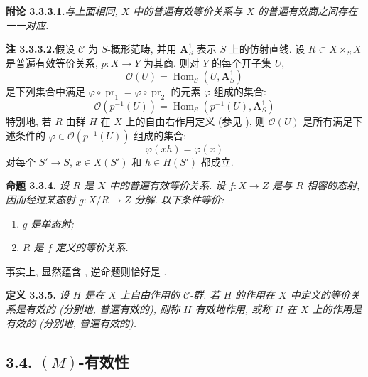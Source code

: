 \medskip
\noindent{}\textbf{附论 3.3.3.1.}\footnotemark[14]
\textit{与上面相同, \(X\) 中的普遍有效等价关系与
\(X\) 的普遍有效商之间存在一一对应.}

\medskip
\noindent{}\textbf{注 3.3.3.2.}\footnotemark[14]
假设 \(\mathscr C\) 为 \(S\)-概形范畴, 并用 \(\mathbf A^1_S\)
表示 \(S\) 上的仿射直线. 设 \(R\subset X\times_S X\)
是普遍有效等价关系, \(p:X\to Y\) 为其商.
则对 \(Y\) 的每个开子集 \(U\),
\[
  \mathcal O(U)=\operatorname{Hom}_S(U,\mathbf A^1_S)
\]
是下列集合中满足 \(\varphi\circ\operatorname{pr}_1
=\varphi\circ\operatorname{pr}_2\) 的元素 \(\varphi\) 组成的集合:
\[
  \mathcal O(p^{-1}(U))
  =\operatorname{Hom}_S(p^{-1}(U),\mathbf A^1_S)
\]
特别地, 若 \(R\) 由群 \(H\) 在 \(X\) 上的自由右作用定义
(参见 ),
则 \(\mathcal O(U)\) 是所有满足下述条件的
\(\varphi\in\mathcal O(p^{-1}(U))\) 组成的集合:
\[
  \varphi(xh)=\varphi(x)
\]
对每个 \(S'\to S\), \(x\in X(S')\) 和 \(h\in H(S')\) 都成立.

\medskip
\noindent{}\textbf{命题 3.3.4.}
\textit{设 \(R\) 是 \(X\) 中的普遍有效等价关系.
设 \(f:X\to Z\) 是与 \(R\) 相容的态射,
因而经过某态射 \(g:X/R\to Z\) 分解. 以下条件等价:}
\begin{enumerate}
  \item[(i)]
  \textit{\(g\) 是单态射;}
  \item[(ii)]
  \textit{\(R\) 是 \(f\) 定义的等价关系.}
\end{enumerate}

事实上, 
显然蕴含 ,
逆命题则恰好是 .

\medskip
\noindent{}\textbf{定义 3.3.5.}
\textit{设 \(H\) 是在 \(X\) 上自由作用的 \(\mathscr C\)-群.
若 \(H\) 的作用在 \(X\) 中定义的等价关系是有效的
(分别地, 普遍有效的), 则称 \(H\) \emph{有效地}作用,
或称 \(H\) 在 \(X\) 上的作用是\emph{有效的}
(分别地, \emph{普遍有效的}).}

\subsection*{3.4. \((M)\)-有效性}

